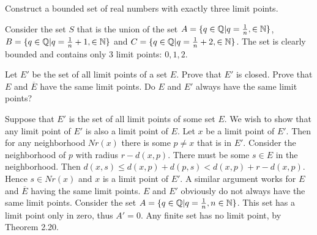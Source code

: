 \begin{problem}
  Construct a bounded set of real numbers with exactly three limit points.
\end{problem}

\begin{solution}
  Consider the set $S$ that is the union of the set $A = \{q \in \mathbb{Q} | q = \frac{1}{n}, \in \mathbb{N}\}$, $B = \{q \in \mathbb{Q} | q = \frac{1}{n} + 1, \in \mathbb{N}\}$ and $C = \{q \in \mathbb{Q} | q = \frac{1}{n} + 2, \in \mathbb{N}\}$.
  The set is clearly bounded and contains only 3 limit points: $0, 1, 2$.
\end{solution}

\begin{problem}
  Let $E'$ be the set of all limit points of a set $E$.
  Prove that $E'$ is closed.
  Prove that $E$ and $\overline{E}$ have the same limit points.
  Do $E$ and $E'$ always have the same limit points?
\end{problem}

\begin{solution}
  Suppose that $E'$ is the set of all limit points of some set $E$.
  We wish to show that any limit point of $E'$ is also a limit point of $E$.
  Let $x$ be a limit point of $E'$.
  Then for any neighborhood $Nr(x)$ there is some $p \neq x$ that is in $E'$.
  Consider the neighborhood of $p$ with radius $r - d(x, p)$.
  There must be some $s \in E$ in the neighborhood.
  Then $d(x, s) \le d(x, p) + d(p, s) < d(x, p) + r - d(x, p)$.
  Hence $s \in Nr(x)$ and $x$ is a limit point of $E'$.
  A similar argument works for $E$ and $\overline{E}$ having the same limit points.
  $E$ and $E'$ obviously do not always have the same limit points.
  Consider the set $A = \{q \in \mathbb{Q} | q = \frac{1}{n}, n \in \mathbb{N}\}$.
  This set has a limit point only in zero, thus $A' = {0}$.
  Any finite set has no limit point, by Theorem 2.20.
\end{solution}
